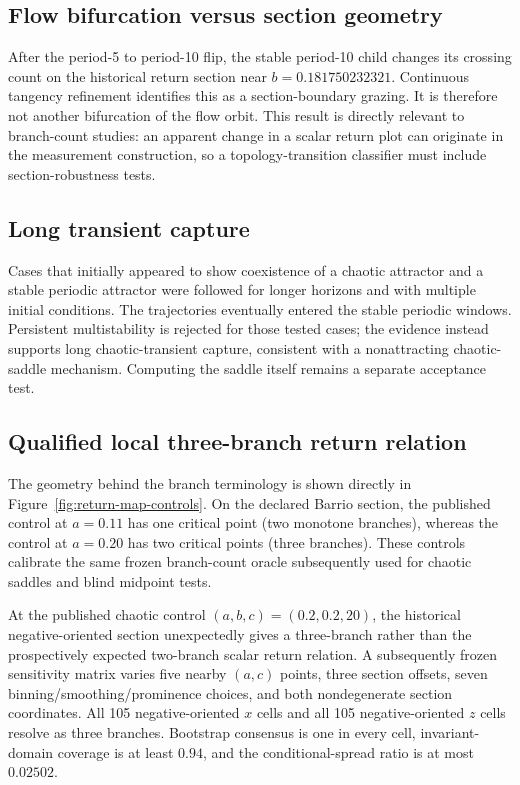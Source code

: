 \subsection{Flow bifurcation versus section geometry}

After the period-5 to period-10 flip, the stable period-10 child changes its
crossing count on the historical return section near
$b=0.181750232321$.  Continuous tangency refinement identifies this as a
section-boundary grazing.  It is therefore not another bifurcation of the flow
orbit.  This result is directly relevant to branch-count studies: an apparent
change in a scalar return plot can originate in the measurement construction,
so a topology-transition classifier must include section-robustness tests.

\subsection{Long transient capture}

Cases that initially appeared to show coexistence of a chaotic attractor and a
stable periodic attractor were followed for longer horizons and with multiple
initial conditions.  The trajectories eventually entered the stable periodic
windows.  Persistent multistability is rejected for those tested cases; the
evidence instead supports long chaotic-transient capture, consistent with a
nonattracting chaotic-saddle mechanism.  Computing the saddle itself remains a
separate acceptance test.

\subsection{Qualified local three-branch return relation}

The geometry behind the branch terminology is shown directly in
Figure~\ref{fig:return-map-controls}.  On the declared Barrio section, the
published control at $a=0.11$ has one critical point (two monotone branches),
whereas the control at $a=0.20$ has two critical points (three branches).
These controls calibrate the same frozen branch-count oracle subsequently
used for chaotic saddles and blind midpoint tests.



At the published chaotic control $(a,b,c)=(0.2,0.2,20)$, the historical
negative-oriented section unexpectedly gives a three-branch rather than the
prospectively expected two-branch scalar return relation.  A subsequently
frozen sensitivity matrix varies five nearby $(a,c)$ points, three section
offsets, seven binning/smoothing/prominence choices, and both nondegenerate
section coordinates.  All 105 negative-oriented $x$ cells and all 105
negative-oriented $z$ cells resolve as three branches.  Bootstrap consensus is
one in every cell, invariant-domain coverage is at least $0.94$, and the
conditional-spread ratio is at most $0.02502$.

